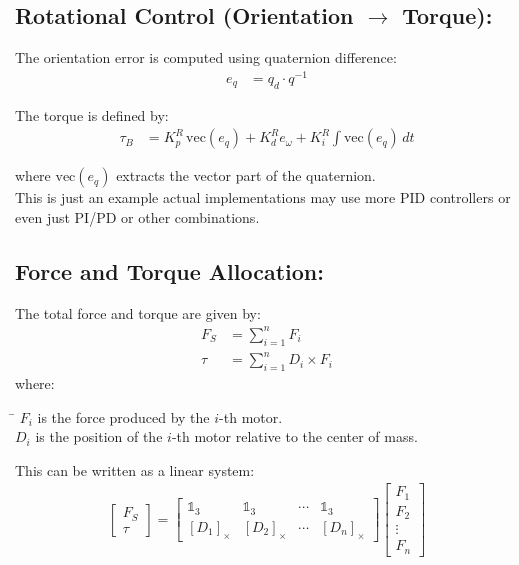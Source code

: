 \documentclass{article}
\begin{document}
\subsection*{Rotational Control (Orientation $\rightarrow$ Torque):}

The orientation error is computed using quaternion difference:
\begin{align*}
    e_q &= q_d \cdot q^{-1}
\end{align*}

The torque is defined by:
\begin{align*}
    \tau_B &= K_p^R \, \text{vec}(e_q) + K_d^R e_\omega + K_i^R \int \text{vec}(e_q) \, dt
\end{align*}

where \( \text{vec}(e_q) \) extracts the vector part of the quaternion.\\

This is just an example actual implementations may use more PID controllers 
or even just PI/PD or other combinations.

\subsection*{Force and Torque Allocation:}

The total force and torque are given by:
\begin{align*}
    F_S &= \sum_{i=1}^{n} F_i \\
    \tau &= \sum_{i=1}^{n} D_i \times F_i
\end{align*}
where:
\begin{tabbing}
    \hspace{1cm}\= \kill
    \> \( F_i \) is the force produced by the \( i \)-th motor. \\
    \> \( D_i \) is the position of the \( i \)-th motor relative to the center of mass. \\
\end{tabbing}

This can be written as a linear system:
\begin{align*}
    \begin{bmatrix}
        F_S \\
        \tau
    \end{bmatrix}
    =
    \begin{bmatrix}
        \mathds{1}_3 & \mathds{1}_3 & \cdots & \mathds{1}_3 \\
        [D_1]_\times & [D_2]_\times & \cdots & [D_n]_\times
    \end{bmatrix}
    \begin{bmatrix}
        F_1 \\
        F_2 \\
        \vdots \\
        F_n
    \end{bmatrix}
\end{align*}
\end{document}
